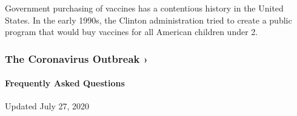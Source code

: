 Government purchasing of vaccines has a contentious history in the
United States. In the early 1990s, the Clinton administration tried to
create a public program that would buy vaccines for all American
children under 2.

\href{https://www.nytimes3xbfgragh.onion/news-event/coronavirus?action=click\&pgtype=Article\&state=default\&region=MAIN_CONTENT_3\&context=storylines_faq}{}

\hypertarget{the-coronavirus-outbreak-}{%
\subsubsection{The Coronavirus Outbreak
›}\label{the-coronavirus-outbreak-}}

\hypertarget{frequently-asked-questions}{%
\paragraph{Frequently Asked
Questions}\label{frequently-asked-questions}}

Updated July 27, 2020


